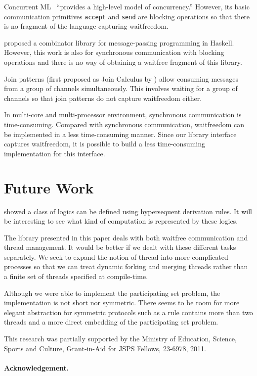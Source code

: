 \documentclass[doctor]{iscs-thesis}
\begin{document}
Concurrent ML~\citep{concurrentML} ``provides a high-level model of
concurrency.''  However, its basic communication primitives
\texttt{accept} and \texttt{send} are blocking operations so that there
is no fragment of the language capturing waitfreedom.

\citet{Brown} proposed a combinator library for message-passing
programming in Haskell.  However, this work is also for synchronous
communication with blocking operations and there is no way of
obtaining a waitfree
fragment of this library.

Join patterns (first proposed as Join Calculus by \citet{join}) allow
consuming messages from a group of
channels simultaneously.  This involves waiting for a group of channels
so that join patterns do not capture waitfreedom either.

In multi-core and multi-processor environment, synchronous communication
is time-consuming.  Compared with
synchronous communication, waitfreedom can be implemented in a less
time-consuming manner.  Since our library
interface captures waitfreedom, it is possible to build a less
time-consuming implementation for this interface.

\section{Future Work}

\citet*{agt08} showed a class of logics can be defined using
hypersequent derivation rules.  It will be interesting to see what kind
of computation is represented by these logics.

The library presented in this paper deals with both waitfree
communication and thread management.  It would be better if we dealt with
these different tasks separately.
 We seek to expand the notion of thread into more complicated
 processes so that we can treat dynamic
 forking and merging threads rather
 than a finite set of threads specified at compile-time.

Although we were able to implement the participating set problem,
the implementation is not short nor symmetric.  
There seems to be room for more elegant abstraction for symmetric
protocols such as
a rule contains more than two threads and a more direct embedding of the
participating set problem.




This research was partially supported by the Ministry of Education,
Science, Sports and Culture, Grant-in-Aid for JSPS Fellows, 23-6978, 2011. 






\paragraph{Acknowledgement.}

\appendix



     
\end{document}
